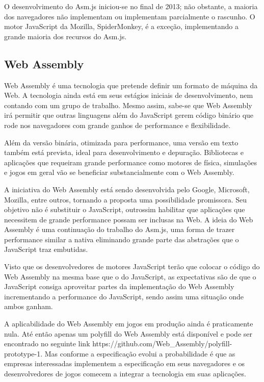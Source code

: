 O desenvolvimento do Asm.js iniciou-se no final de 2013; não obstante,
a maioria dos navegadores não implementam ou implementam parcialmente o
rascunho. O motor JavaScript da Mozilla, SpiderMonkey, é a exceção,
implementando a grande maioria dos recursos do Asm.js.

\subsection{Web Assembly}
Web Assembly é uma tecnologia que pretende definir um formato de
máquina da Web. A tecnologia ainda está em seus estágios iniciais de
desenvolvimento, nem contando com um grupo de trabalho. Mesmo assim,
sabe-se que Web Assembly irá permitir que outras linguagens além do
JavaScript gerem código binário que rode nos navegadores com grande
ganhos de performance e flexibilidade.

Além da versão binária, otimizada para performance, uma versão em
texto também está prevista, ideal para desenvolvimento e depuração.
Bibliotecas e aplicações que requeiram grande performance como
motores de física, simulações e jogos em geral vão se beneficiar
substancialmente com o Web Assembly.

A iniciativa do Web Assembly está sendo desenvolvida pelo Google,
Microsoft, Mozilla, entre outros, tornando a proposta uma possibilidade
promissora. Seu objetivo não é substituir o JavaScript, outrossim
habilitar que aplicações que necessitem de grande performance possam
ser inclusas na Web. A ideia do Web Assembly é uma continuação
do trabalho do Asm.js, uma forma de trazer performance similar a
nativa eliminando grande parte das abstrações que o JavaScript
traz embutidas.

Visto que os desenvolvedores de motores JavaScript terão que colocar
o código do Web Assembly na mesma base que o do JavaScript, as
expectativas são de que o JavaScript consiga aproveitar partes
da implementação do Web Assembly incrementando a performance do
JavaScript, sendo assim uma situação onde ambos ganham.

A aplicabilidade do Web Assembly em jogos em produção ainda
é praticamente nula. Até então apenas um polyfill do Web
Assembly está disponível e pode ser encontrado no seguinte link
https://github.com/Web\_Assembly/polyfill-prototype-1. Mas conforme a
especificação evolui a probabilidade é que as empresas interessadas
implementem a especificação em seus navegadores e os desenvolvedores
de jogos comecem a integrar a tecnologia em suas aplicações.

